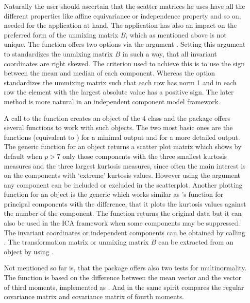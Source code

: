 \documentclass[article,nojss]{jss}
\begin{document}
Naturally the user should ascertain that the scatter matrices he uses have all the different properties like affine equivariance or independence property and so on, needed for the application 
at hand. The application has also an impact on the preferred form
of the unmixing matrix $B$, which as mentioned above is not unique. The function  offers two options via the argument . Setting this argument
to  standardizes the unmixing matrix $B$ in such a way, that all invariant coordinates are right skewed. The criterion used to achieve this is to use the sign between the mean and 
median of each component. Whereas the option  standardizes the ummixing matrix such that each row has norm
1 and in each row the element with the largest absolute value has a positive sign. The later method is more natural in an independent component model framework.

A call to the function  creates an object of the 4 class  and the package offers several functions to work with such objects. The two most basic ones are
the functions  (equivalent to ) for a minimal output and  for a more detailed output. The generic function  for an  object returns
a scatter plot matrix which shows by default when $p>7$ only those components with the three smallest kurtosis measures and the three largest kurtosis measures, since often the main interest
is on the components with `extreme' kurtosis values. However using the  argument any component can be included or excluded in the scatterplot. Another plotting function for
an  object is the generic  which works similar as 's function  for principal components with the difference, that it plots the kurtosis values 
against
the number of the component. The function  returns the original data but it can also be used in the ICA framework when some components may be suppressed. The invariant coordinates
or independent components can be obtained by calling . The transformation matrix or unmixing matrix $B$ can be extracted from an  object by using .

Not mentioned so far is, that the package offers also two tests for multinormality. The function  is based on the difference between the mean vector and the vector of third 
moments,
implemented as . And in the same spirit compares  the regular covariance matrix and covariance matrix of fourth moments.
\end{document}
